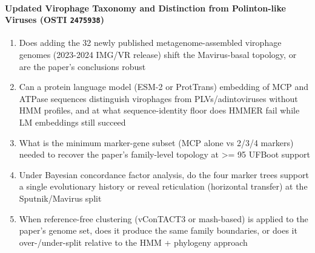 \paragraph{Updated Virophage Taxonomy and Distinction from Polinton-like Viruses \textnormal{\small(OSTI \texttt{2475938})}}
\begin{enumerate}[leftmargin=1.6em,itemsep=0.2em,topsep=0.2em,label=Q\arabic*.]
\item Does adding the 32 newly published metagenome-assembled virophage genomes (2023-2024 IMG/VR release) shift the Mavirus-basal topology, or are the paper's conclusions robust
\item Can a protein language model (ESM-2 or ProtTrans) embedding of MCP and ATPase sequences distinguish virophages from PLVs/adintoviruses without HMM profiles, and at what sequence-identity floor does HMMER fail while LM embeddings still succeed
\item What is the minimum marker-gene subset (MCP alone vs 2/3/4 markers) needed to recover the paper's family-level topology at \textgreater{}= 95 UFBoot support
\item Under Bayesian concordance factor analysis, do the four marker trees support a single evolutionary history or reveal reticulation (horizontal transfer) at the Sputnik/Mavirus split
\item When reference-free clustering (vConTACT3 or mash-based) is applied to the paper's genome set, does it produce the same family boundaries, or does it over-/under-split relative to the HMM + phylogeny approach
\end{enumerate}
